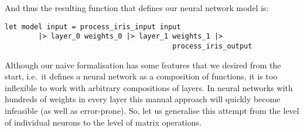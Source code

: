 \documentclass[runningheads]{llncs}
\begin{document}
And thus the resulting function that defines our neural network model is:


\begin{lstlisting}[language=caml]
let model input = process_iris_input input
        |> layer_0 weights_0 |> layer_1 weights_1 |>
                                        process_iris_output
\end{lstlisting}

Although our naive formalisation has some features that we desired from the start, i.e.\ it defines a neural network as a composition of functions,
it is too inflexible to work with arbitrary compositions of layers.
In neural networks with hundreds of weights in every layer this manual approach will quickly become infeasible (as well as error-prone).
So, let us generalise this attempt from the level of individual neurons to the level of matrix operations.
\end{document}

